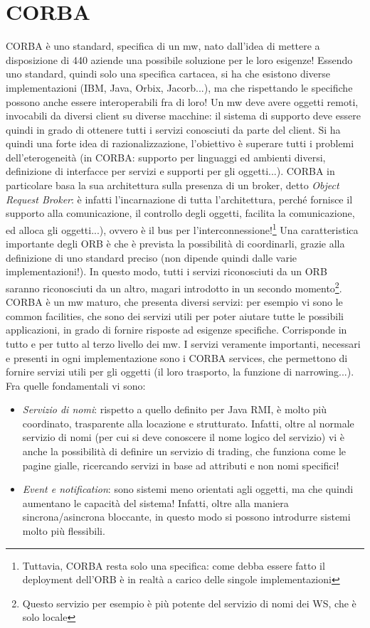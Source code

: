\chapter{CORBA}
CORBA è uno standard, specifica di un mw, nato dall'idea di mettere a disposizione di 440 aziende una possibile
soluzione per le loro esigenze!
Essendo uno standard, quindi solo una specifica cartacea, si ha che esistono diverse implementazioni (IBM, Java, Orbix,
Jacorb...), ma che rispettando le specifiche possono anche essere interoperabili fra di loro!
Un mw deve avere oggetti remoti, invocabili da diversi client su diverse macchine: il sistema di supporto deve essere
quindi in grado di ottenere tutti i servizi conosciuti da parte del client. Si ha quindi una forte idea di
razionalizzazione, l'obiettivo è superare tutti i problemi dell'eterogeneità (in CORBA: supporto per linguaggi ed
ambienti diversi, definizione di interfacce per servizi e supporti per gli oggetti...).
CORBA in particolare basa la sua architettura sulla presenza di un broker, detto \textit{Object Request Broker}: è
infatti l'incarnazione di tutta l'architettura, perché fornisce il supporto alla comunicazione, il controllo degli
oggetti, facilita la comunicazione, ed alloca gli oggetti...), ovvero è il bus per
l'interconnessione!\footnote{Tuttavia, CORBA resta solo una specifica: come debba essere fatto il deployment
dell'ORB è in realtà a carico delle singole implementazioni} Una caratteristica importante degli ORB è che è prevista la
possibilità di coordinarli, grazie alla definizione di uno standard preciso (non dipende quindi dalle varie
implementazioni!). In questo modo, tutti i servizi riconosciuti da un ORB saranno riconosciuti da un altro, magari
introdotto in un secondo momento\footnote{Questo servizio per esempio è più potente del servizio di nomi dei WS, che è
solo locale}.
CORBA è un mw maturo, che presenta diversi servizi: per esempio vi sono le common facilities, che sono dei servizi utili
per poter aiutare tutte le possibili applicazioni, in grado di fornire risposte ad esigenze specifiche. Corrisponde in
tutto e per tutto al terzo livello dei mw.
I servizi veramente importanti, necessari e presenti in ogni implementazione sono i CORBA services, che
permettono di fornire servizi utili per gli oggetti (il loro trasporto, la funzione di narrowing...).
Fra quelle fondamentali vi sono:
\begin{itemize}
 \item \textit{Servizio di nomi}: rispetto a quello definito per Java RMI, è molto più coordinato, trasparente alla locazione e strutturato. Infatti, oltre al normale servizio di nomi (per cui si deve conoscere il nome logico del servizio) vi
 è  anche la possibilità di definire un servizio di trading, che funziona come le pagine gialle, ricercando servizi in base ad attributi e non nomi specifici!
 \item \textit{Event e notification}: sono sistemi meno orientati agli oggetti, ma che quindi aumentano le capacità del
 sistema! Infatti, oltre alla maniera sincrona/asincrona bloccante, in questo modo si possono introdurre sistemi
 molto più flessibili.
\end{itemize}
